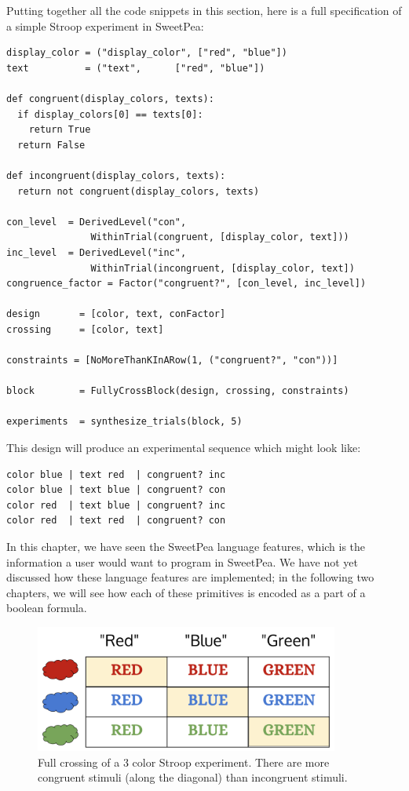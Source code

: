 Putting together all the code snippets in this section, here is a full specification of a simple Stroop experiment in SweetPea:

\begin{verbatim}
display_color = ("display_color", ["red", "blue"])
text          = ("text",      ["red", "blue"])

def congruent(display_colors, texts):
  if display_colors[0] == texts[0]:
    return True
  return False

def incongruent(display_colors, texts):
  return not congruent(display_colors, texts)

con_level  = DerivedLevel("con",
               WithinTrial(congruent, [display_color, text]))
inc_level  = DerivedLevel("inc",
               WithinTrial(incongruent, [display_color, text])
congruence_factor = Factor("congruent?", [con_level, inc_level])

design       = [color, text, conFactor]
crossing     = [color, text]

constraints = [NoMoreThanKInARow(1, ("congruent?", "con"))]

block        = FullyCrossBlock(design, crossing, constraints)

experiments  = synthesize_trials(block, 5)
\end{verbatim}

This design will produce an experimental sequence which might look like:

\begin{verbatim}
color blue | text red  | congruent? inc
color blue | text blue | congruent? con
color red  | text blue | congruent? inc
color red  | text red  | congruent? con
\end{verbatim}


In this chapter, we have seen the SweetPea language features, which is the information a user would want to program in SweetPea. We have not yet discussed how these language features are implemented; in the following two chapters, we will see how each of these primitives is encoded as a part of a boolean formula.


\begin{figure}
    \centerline{\includegraphics[origin=c,width=10cm]{fig_weighted_crossing}}
    \caption{Full crossing of a 3 color Stroop experiment. There are more congruent stimuli (along the diagonal) than incongruent stimuli.}%
    \label{fig:weighted_crossing_init}%
\end{figure}


